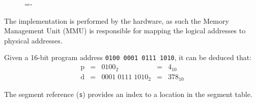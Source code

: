 \documentclass[a4paper]{systems-software}
\begin{document}
\begin{figure}[H]
  \lineskip=-\fboxrule
\end{figure}

The implementation is performed by the hardware, as such the Memory Management Unit (MMU) is responsible for mapping the logical addresses to physical addresses.

Given a 16-bit program address \texttt{0100 0001 0111 1010}, it can be deduced that:
\begin{equation*}
	\begin{aligned}
		\text{p} & = & 0100_{2} & = & 4_{10} \\
		\text{d} & = & 0001\;0111\;1010_{2} & = & 378_{10}
	\end{aligned}
\end{equation*}

The segment reference (\texttt{s}) provides an index to a location in the segment table.
\end{document}
